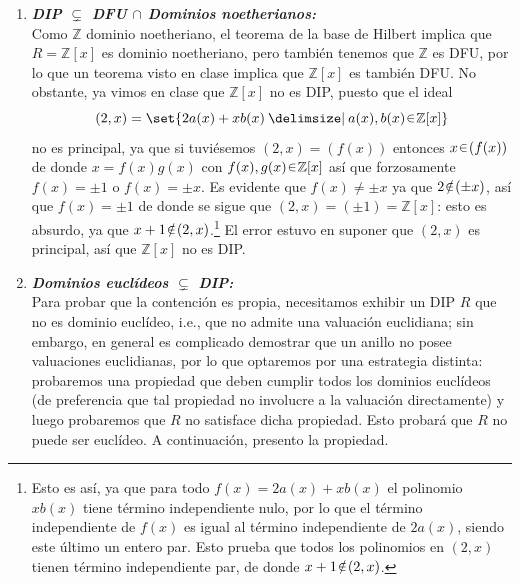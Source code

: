 \begin{sol}
\begin{enumerate}[label={\bfseries\Roman*}., wide, itemsep=1em]
\item{}
\emph{\bfseries DIP $\subsetneq$ DFU $\cap$ Dominios noetherianos:}\\
Como $\mathbb{Z}$ dominio noetheriano, el teorema de la base de Hilbert implica que $R = \mathbb{Z}[x]$ es dominio noetheriano, pero también tenemos que $\mathbb{Z}$ es DFU, por lo que un teorema visto en clase implica que $\mathbb{Z}[x]$ es también DFU. No obstante, ya vimos en clase que $\mathbb{Z}[x]$ no es DIP, puesto que el ideal
\[
(2,x) = \set{2a(x) + xb(x) \given a(x),b(x) \en \mathbb{Z}[x]}
\]
no es principal, ya que si tuviésemos $(2,x) = (f(x))$ entonces $x \en (f(x))$ de donde $x = f(x)g(x)$ con $f(x),g(x) \en \mathbb{Z}[x]$ así que forzosamente $f(x) = \pm 1$ o $f(x) = \pm x$. Es evidente que $f(x) \neq \pm x$ ya que $2 \noten (\pm x)$, así que $f(x) = \pm1$ de donde se sigue que $(2,x) = (\pm1) = \mathbb{Z}[x]$: esto es absurdo, ya que $x + 1 \noten (2,x)$.\footnote{Esto es así, ya que para todo $f(x) = 2a(x) + xb(x)$ el polinomio $xb(x)$ tiene término independiente nulo, por lo que el término independiente de $f(x)$ es igual al término independiente de $2a(x)$, siendo este último un entero par. Esto prueba que todos los polinomios en $(2,x)$ tienen término independiente par, de donde $x+1 \noten (2,x)$.} El error estuvo en suponer que $(2,x)$ es principal, así que $\mathbb{Z}[x]$ no es DIP.

\item{}
\emph{\bfseries Dominios euclídeos $\subsetneq$ DIP:}\\
Para probar que la contención es propia, necesitamos exhibir un DIP $R$ que no es dominio euclídeo, i.e., que no admite una valuación euclidiana; sin embargo, en general es complicado demostrar que un anillo no posee valuaciones euclidianas, por lo que optaremos por una estrategia distinta: probaremos una propiedad que deben cumplir todos los dominios euclídeos (de preferencia que tal propiedad no involucre a la valuación directamente) y luego probaremos que $R$ no satisface dicha propiedad. Esto probará que $R$ no puede ser euclídeo. A continuación, presento la propiedad.


\end{enumerate}
\end{sol}

